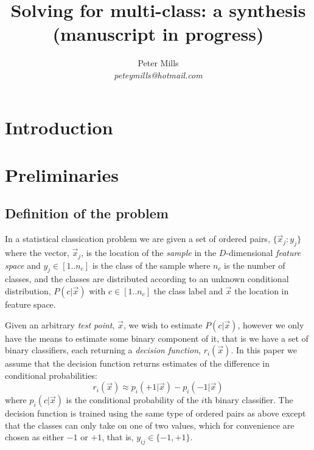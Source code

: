 \documentclass{article}
\begin{document}
\title{Solving for multi-class: a synthesis\\(manuscript in progress)}

\author{Peter Mills\\\textit{peteymills@hotmail.com}}

\maketitle

\section{Introduction}

\section{Preliminaries}

\subsection{Definition of the problem}

\label{description}

In a statistical classication problem we are given a set of ordered pairs, 
$\lbrace \vec x_j : y_j \rbrace$ 
where the vector, $\vec x_j$, is the location of the {\it sample} in 
the $D$-dimensional {\it feature space} 
and $y_j \in [1..n_c]$ is the class of the sample
where $n_c$ is the number of classes,
and the classes are
distributed according to an unknown conditional distribution,
$P(c | \vec x)$ with $c \in [1..n_c]$ the class label and $\vec x$ the location
in feature space.

Given an arbitrary {\it test point}, $\vec x$, 
we wish to estimate $P(c | \vec x)$, however we only have
the means to estimate some binary component of it, that is we have a 
set of binary classifiers, 
each returning a {\it decision function}, $r_i(\vec x)$.
In this paper we assume that the decision function 
returns estimates of the difference in conditional probabilities:
\begin{equation}
	r_i(\vec x) \approx p_i(+1|\vec x) - p_i(-1|\vec x)
\end{equation}
where $p_i(c|\vec x)$ is the conditional probability of the $i$th
binary classifier.
The decision function is trained using the same type of ordered pairs as
above except that the classes can only take on one of two values,
which for convenience are chosen as either $-1$ or $+1$, 
that is, $y_{ij} \in \lbrace -1, +1 \rbrace$.
\end{document}
